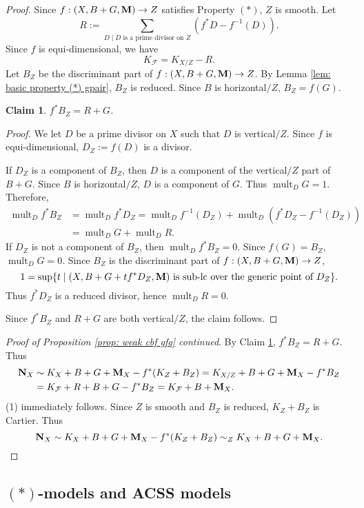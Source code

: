 \documentclass[11pt]{amsart}
\numberwithin{equation}{section}
\newcommand{\Mm}{{\bf{M}}}
\newcommand{\Nn}{{\bf{N}}}
\newcommand{\mult}{\operatorname{mult}}
\newcommand{\Ff}{\mathcal{F}}
\newtheorem{claim}[thm]{Claim}
\theoremstyle{definition}
\theoremstyle{definition}
\theoremstyle{definition}
\begin{document}
\begin{proof}
Since $f: (X,B+G,\Mm)\rightarrow Z$ satisfies Property $(*)$, $Z$ is smooth. Let
$$R:=\sum_{D\mid D\text{ is a prime divisor on }Z}(f^*D-f^{-1}(D)).$$
Since $f$ is equi-dimensional, we have
$$K_{\Ff}=K_{X/Z}-R.$$
Let $B_Z$ be the discriminant part of $f: (X,B+G,\Mm)\rightarrow Z$. By Lemma \ref{lem: basic property (*) gpair}, $B_Z$ is reduced. Since $B$ is horizontal$/Z$, $B_Z=f(G)$.
\begin{claim}\label{claim: f*B_Z=R+G}
    $f^*B_Z=R+G$.
\end{claim}
\begin{proof}
    We let $D$ be a prime divisor on $X$ such that $D$ is vertical$/Z$. Since $f$ is equi-dimensional, $D_Z:=f(D)$ is a divisor. 

    If $D_Z$ is a component of $B_Z$, then $D$ is a component of the vertical$/Z$ part of $B+G$. Since $B$ is horizontal$/Z$, $D$ is a component of $G$. Thus $\mult_DG=1$. Therefore, 
    \begin{align*}
    \mult_Df^*B_Z&=\mult_Df^*D_Z=\mult_Df^{-1}(D_Z)+\mult_D(f^*D_Z-f^{-1}(D_Z))\\
    &=\mult_DG+\mult_DR.
\end{align*}
If $D_Z$ is not a component of $B_Z$, then $\mult_Df^*B_Z=0$. Since $f(G)=B_Z$, $\mult_DG=0$. Since $B_Z$ is the discriminant part of $f: (X,B+G,\Mm)\rightarrow Z$,
$$1=\sup\{t\mid (X,B+G+tf^*D_Z,\Mm)\text{ is sub-lc over the generic point of }D_Z\}.$$
Thus $f^*D_Z$ is a reduced divisor, hence $\mult_DR=0$. 

Since $f^*B_Z$ and $R+G$ are both vertical$/Z$, the claim follows.
\end{proof}
\noindent\textit{Proof of Proposition \ref{prop: weak cbf gfq} continued}. By Claim \ref{claim: f*B_Z=R+G}, $f^*B_Z=R+G$. Thus
\begin{align*}
    \Nn_X&\sim K_X+B+G+\Mm_X-f^*(K_Z+B_Z)=K_{X/Z}+B+G+\Mm_X-f^*B_Z\\
    &=K_{\Ff}+R+B+G-f^*B_Z=K_{\Ff}+B+\Mm_X.
\end{align*}
(1) immediately follows. Since $Z$ is smooth and $B_Z$ is reduced, $K_Z+B_Z$ is Cartier. Thus
$$\Nn_X\sim K_X+B+G+\Mm_X-f^*(K_Z+B_Z)\sim_Z K_X+B+G+\Mm_X.$$
\end{proof}

\subsection{\texorpdfstring{$(*)$-}{ }models and ACSS models}
\end{document}

